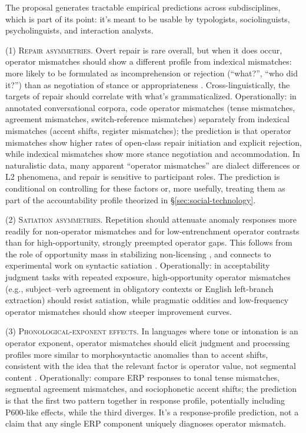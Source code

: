 \documentclass[12pt,letterpaper]{article}
\begin{document}
The proposal generates tractable empirical predictions across subdisciplines, which is part of its point: it's meant to be usable by typologists, sociolinguists, psycholinguists, and interaction analysts.

\textsc{(1) Repair asymmetries.} Overt repair is rare overall, but when it does occur, operator mismatches should show a different profile from indexical mismatches: more likely to be formulated as incomprehension or rejection (\enquote{what?}, \enquote{who did it?}) than as negotiation of stance or appropriateness \citep{schegloffjeffersonsacks1977}. Cross-linguistically, the targets of repair should correlate with what's grammaticalized. Operationally: in annotated conversational corpora, code operator mismatches (tense mismatches, agreement mismatches, switch-reference mismatches) separately from indexical mismatches (accent shifts, register mismatches); the prediction is that operator mismatches show higher rates of open-class repair initiation and explicit rejection, while indexical mismatches show more stance negotiation and accommodation. In naturalistic data, many apparent \enquote{operator mismatches} are dialect differences or L2 phenomena, and repair is sensitive to participant roles. The prediction is conditional on controlling for these factors or, more usefully, treating them as part of the accountability profile theorized in \S\ref{sec:social-technology}.

\textsc{(2) Satiation asymmetries.} Repetition should attenuate anomaly responses more readily for non-operator mismatches and for low-entrenchment operator contrasts than for high-opportunity, strongly preempted operator gaps. This follows from the role of opportunity mass in stabilizing non-licensing \citep{bybee2006,bybee2010}, and connects to experimental work on syntactic satiation \citep{snyder2000,sprouse2009}. Operationally: in acceptability judgment tasks with repeated exposure, high-opportunity operator mismatches (e.g., subject--verb agreement in obligatory contexts or English left-branch extraction) should resist satiation, while pragmatic oddities and low-frequency operator mismatches should show steeper improvement curves.

\textsc{(3) Phonological-exponent effects.} In languages where tone or intonation is an operator exponent, operator mismatches should elicit judgment and processing profiles more similar to morphosyntactic anomalies than to accent shifts, consistent with the idea that the relevant factor is operator value, not segmental content \citep{hyman2011,ladd2008}. Operationally: compare ERP responses to tonal tense mismatches, segmental agreement mismatches, and sociophonetic accent shifts; the prediction is that the first two pattern together in response profile, potentially including P600-like effects, while the third diverges. It's a response-profile prediction, not a claim that any single ERP component uniquely diagnoses operator mismatch.
\end{document}
